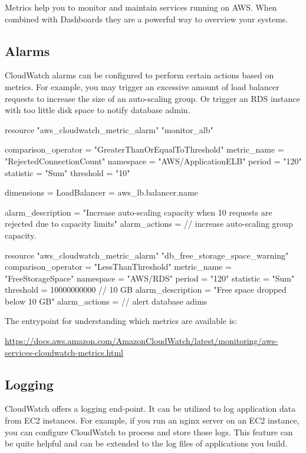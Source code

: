 \documentclass{csse4400}
\begin{document}
Metrics help you to monitor and maintain services running on AWS.
When combined with Dashboards they are a powerful way to overview your systems.

\subsection{Alarms}
CloudWatch alarms can be configured to perform certain actions based on metrics.
For example, you may trigger an excessive amount of load balancer requests to increase the size of an auto-scaling group.
Or trigger an RDS instance with too little disk space to notify database admin.

\begin{code}[language=terraform]{}
resource "aws_cloudwatch_metric_alarm" "monitor_alb" {
  comparison_operator = "GreaterThanOrEqualToThreshold"
  metric_name         = "RejectedConnectionCount"
  namespace           = "AWS/ApplicationELB"
  period              = "120"
  statistic           = "Sum"
  threshold           = "10"

  dimensions = {
    LoadBalancer = aws_lb.balancer.name
  }

  alarm_description = "Increase auto-scaling capacity when 10 requests are rejected due to capacity limits"
  alarm_actions     = // increase auto-scaling group capacity.
}

resource "aws_cloudwatch_metric_alarm" "db_free_storage_space_warning" {
  comparison_operator = "LessThanThreshold"
  metric_name         = "FreeStorageSpace"
  namespace           = "AWS/RDS"
  period              = "120"
  statistic           = "Sum"
  threshold           = 10000000000 // 10 GB
  alarm_description   = "Free space dropped below 10 GB"
  alarm_actions       = // alert database adims
}
\end{code}


\noindent The entrypoint for understanding which metrics are available is:

\noindent \url{https://docs.aws.amazon.com/AmazonCloudWatch/latest/monitoring/aws-services-cloudwatch-metrics.html}

\subsection{Logging}
CloudWatch offers a logging end-point.
It can be utilized to log application data from EC2 instances.
For example, if you run an nginx server on an EC2 instance,
you can configure CloudWatch to process and store those logs.
This feature can be quite helpful and can be extended to the log files of applications you build.
\end{document}
